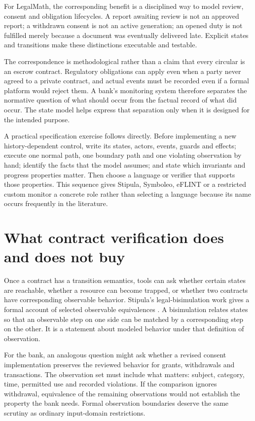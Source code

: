 For LegalMath, the corresponding benefit is a disciplined way to model review,
consent and obligation lifecycles. A report awaiting review is not an approved
report; a withdrawn consent is not an active generation; an opened duty is not
fulfilled merely because a document was eventually delivered late. Explicit
states and transitions make these distinctions executable and testable.

The correspondence is methodological rather than a claim that every circular is
an escrow contract. Regulatory obligations can apply even when a party never
agreed to a private contract, and actual events must be recorded even if a formal
platform would reject them. A bank's monitoring system therefore separates the
normative question of what should occur from the factual record of what did
occur. The state model helps express that separation only when it is designed
for the intended purpose.

A practical specification exercise follows directly. Before implementing a new
history-dependent control, write its states, actors, events, guards and effects;
execute one normal path, one boundary path and one violating observation by hand;
identify the facts that the model assumes; and state which invariants and progress
properties matter. Then choose a language or verifier that supports those
properties. This sequence gives Stipula, Symboleo, eFLINT or a restricted custom
monitor a concrete role rather than selecting a language because its name occurs
frequently in the literature.

\section{What contract verification does and does not buy}
\label{merge:M04:07}

\label{sec:languages-contractverification}
Once a contract has a transition semantics, tools can ask whether certain
states are reachable, whether a resource can become trapped, or whether two
contracts have corresponding observable behavior. Stipula's legal-bisimulation
work gives a formal account of selected observable equivalences
\citep[behavioral equivalence section]{stipula2021}. A bisimulation relates
states so that an observable step on one side can be matched by a corresponding
step on the other. It is a statement about modeled behavior under that
definition of observation.

For the bank, an analogous question might ask whether a revised consent
implementation preserves the reviewed behavior for grants, withdrawals and
transactions. The observation set must include what matters: subject, category,
time, permitted use and recorded violations. If the comparison ignores
withdrawal, equivalence of the remaining observations would not establish the
property the bank needs. Formal observation boundaries deserve the same
scrutiny as ordinary input-domain restrictions.

